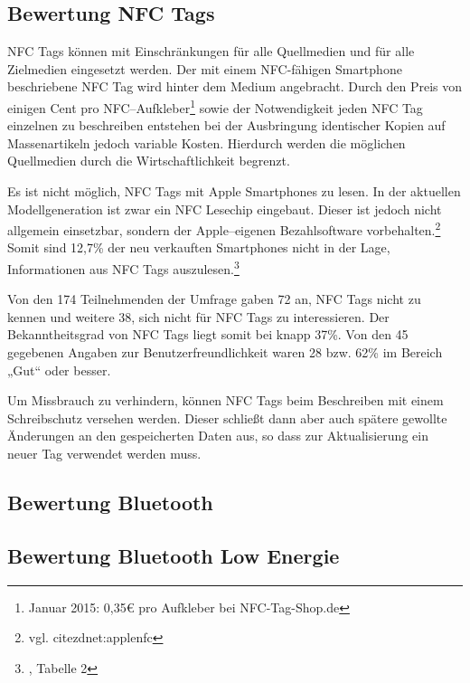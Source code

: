 \subsection{Bewertung NFC Tags} %
\label{sub:bewertung_nfc_tags}
NFC Tags können mit Einschränkungen für alle Quellmedien und für alle Zielmedien eingesetzt werden. Der mit einem NFC-fähigen Smartphone beschriebene NFC Tag wird hinter dem Medium angebracht. Durch den Preis von einigen Cent pro NFC–Aufkleber\footnote{Januar 2015: 0,35€ pro Aufkleber bei NFC-Tag-Shop.de} sowie der Notwendigkeit jeden NFC Tag einzelnen zu beschreiben entstehen bei der Ausbringung identischer Kopien auf Massenartikeln jedoch variable Kosten. Hierdurch werden die möglichen Quellmedien durch die Wirtschaftlichkeit begrenzt.

Es ist nicht möglich, NFC Tags mit Apple Smartphones zu lesen. In der aktuellen Modellgeneration ist zwar ein NFC Lesechip eingebaut. Dieser ist jedoch nicht allgemein einsetzbar, sondern der Apple–eigenen Bezahlsoftware vorbehalten.\footnote{vgl. cite{zdnet:applenfc}}
Somit sind 12,7\% der neu verkauften Smartphones nicht in der Lage, Informationen aus NFC Tags auszulesen.\footnote{\cite{garnter:os}, Tabelle 2}

Von den 174 Teilnehmenden der Umfrage gaben 72 an, NFC Tags nicht zu kennen und weitere 38, sich nicht für NFC Tags zu interessieren. Der Bekanntheitsgrad von NFC Tags liegt somit bei knapp 37\%. Von den 45 gegebenen Angaben zur Benutzerfreundlichkeit waren 28 bzw. 62\% im Bereich „Gut“ oder besser. 

Um Missbrauch zu verhindern, können NFC Tags beim Beschreiben mit einem Schreibschutz versehen werden. Dieser schließt dann aber auch spätere gewollte Änderungen an den gespeicherten Daten aus, so dass zur Aktualisierung ein neuer Tag verwendet werden muss.

\subsection{Bewertung Bluetooth} %
\label{sub:bewertung_bluetooth}


\subsection{Bewertung Bluetooth Low Energie} %
\label{sub:bewertung_bluetooth_low_energie}

